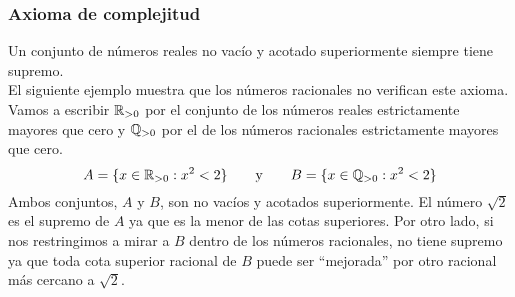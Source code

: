 \documentclass[../Teoría.root.tex]{subfiles}
\begin{document}
\subsubsection{Axioma de complejitud}
Un conjunto de números reales no vacío y acotado superiormente siempre tiene supremo.\\
El siguiente ejemplo muestra que los números racionales no verifican este axioma.
Vamos a escribir \(\mathbb{R}_{>0}\) por el conjunto de los números reales estrictamente mayores que cero y \(\mathbb{Q}_{>0}\) por el de los números racionales estrictamente mayores que cero.
\[A = \{x \in \mathbb{R}_{>0} : x^2 < 2\}\qquad\text{y}\qquad B = \{x \in \mathbb{Q}_{>0} : x^2 < 2\}\]
Ambos conjuntos, \(A\) y \(B\), son no vacíos y acotados superiormente.
El número \(\sqrt{2}\) es el supremo de \(A\) ya que es la menor de las cotas superiores.
Por otro lado, si nos restringimos a mirar a \(B\) dentro de los números racionales, no tiene supremo ya que toda cota superior racional de \(B\) puede ser “mejorada” por otro racional más cercano a \(\sqrt{2}\).
\end{document}
